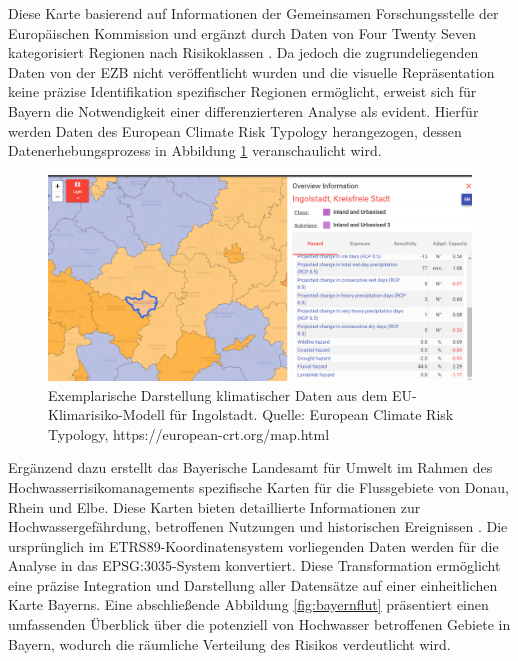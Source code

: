 Diese Karte basierend auf Informationen der Gemeinsamen Forschungsstelle der Europäischen Kommission und ergänzt durch Daten von Four Twenty Seven kategorisiert Regionen nach Risikoklassen \parencite{ECB2022ClimateStressTest}. Da jedoch die zugrundeliegenden Daten von der \ac{EZB} nicht veröffentlicht wurden und die visuelle Repräsentation keine präzise Identifikation spezifischer Regionen ermöglicht, erweist sich für Bayern die Notwendigkeit einer differenzierteren Analyse als evident. Hierfür werden Daten des European Climate Risk Typology \parencite{Carter2018} herangezogen, dessen Datenerhebungsprozess in Abbildung \ref{fig:ing} veranschaulicht wird.
\begin{figure}[htbp]
    \centering
    \includegraphics[width=\textwidth]{figures/EUclimateriskIng.png} 
    \caption{Exemplarische Darstellung klimatischer Daten aus dem EU-Klimarisiko-Modell für Ingolstadt. Quelle: European Climate Risk Typology, https://european-crt.org/map.html}
    \label{fig:ing}
\end{figure}
\FloatBarrier
Ergänzend dazu erstellt das Bayerische Landesamt für Umwelt im Rahmen des Hochwasserrisikomanagements spezifische Karten für die Flussgebiete von Donau, Rhein und Elbe. Diese Karten bieten detaillierte Informationen zur Hochwassergefährdung, betroffenen Nutzungen und historischen Ereignissen \parencite{LfU_Bayern}.
Die ursprünglich im ETRS89-Koordinatensystem vorliegenden Daten werden für die Analyse in das EPSG:3035-System konvertiert. Diese Transformation ermöglicht eine präzise Integration und Darstellung aller Datensätze auf einer einheitlichen Karte Bayerns.
Eine abschließende Abbildung \ref{fig:bayernflut} präsentiert einen umfassenden Überblick über die potenziell von Hochwasser betroffenen Gebiete in Bayern, wodurch die räumliche Verteilung des Risikos verdeutlicht wird.
